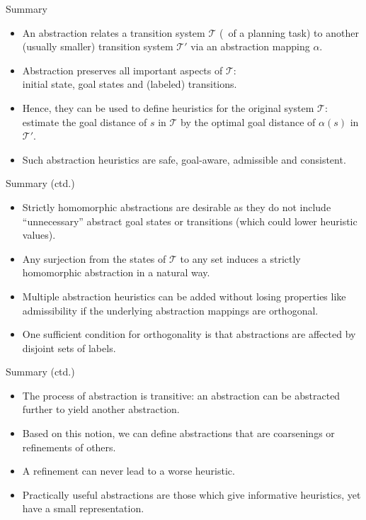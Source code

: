 \documentclass{gkibeamer}
\begin{document}
\begin{frame}{Summary}
  \begin{itemize}
  \item An \alert{abstraction} relates a transition system $\mathcal
    T$ (\eg\ of a planning task) to another (usually smaller)
    transition system $\mathcal T'$ via an \alert{abstraction mapping}
    $\alpha$.
  \item Abstraction \alert{preserves all important aspects} of
    $\mathcal T$: \\ initial state, goal states and (labeled)
    transitions.
  \item Hence, they can be used to define \alert{heuristics} for the
    original system $\mathcal T$: estimate the goal distance of $s$ in
    $\mathcal T$ by the optimal goal distance of $\alpha(s)$ in
    $\mathcal T'$.
  \item Such \alert{abstraction heuristics} are \alert{safe},
    \alert{goal-aware}, \alert{admissible} and \alert{consistent}.
  \end{itemize}
\end{frame}

\begin{frame}{Summary (ctd.)}
  \begin{itemize}
  \item \alert{Strictly homomorphic abstractions} are desirable as
    they do not include ``unnecessary'' abstract goal states or
    transitions (which could lower heuristic values).
  \item Any surjection from the states of $\mathcal T$ to any set
    induces a strictly homomorphic abstraction in a natural way.
  \item Multiple abstraction heuristics can be added without losing
    properties like admissibility if the underlying abstraction
    mappings are \alert{orthogonal}.
  \item One sufficient condition for orthogonality is that
    abstractions are \alert{affected} by disjoint sets of labels.
  \end{itemize}
\end{frame}

\begin{frame}{Summary (ctd.)}
  \begin{itemize}
  \item The process of abstraction is \alert{transitive}: an
    abstraction can be abstracted further to yield another
    abstraction.
  \item Based on this notion, we can define abstractions that are
    \alert{coarsenings} or \alert{refinements} of others.
  \item A refinement can never lead to a worse heuristic.
  \item Practically useful abstractions are those which give
    \alert{informative heuristics}, yet have a \alert{small
      representation}.
  \end{itemize}
\end{frame}
\end{document}
